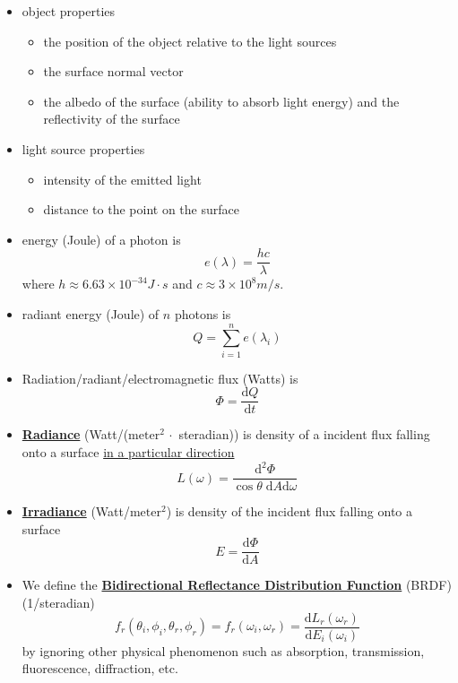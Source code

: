 \documentclass[twocolumn,landscape,10pt]{article}
\theoremstyle{definition}
\begin{document}
\begin{itemize}
    \item object properties
        \begin{itemize}
            \item the position of the object relative to the light sources
            \item the surface normal vector
            \item the albedo of the surface (ability to absorb light energy) and
                the reflectivity of the surface
        \end{itemize} 
    \item light source properties
        \begin{itemize}
            \item intensity of the emitted light
            \item distance to the point on the surface
        \end{itemize} 
    \item energy (Joule) of a photon is
        \[
            e(\lambda) = \frac{hc}{\lambda}
        \]
        where $h\approx 6.63\times 10^{-34}J\cdot s$ and $c\approx 3\times
        10^{8}m/s$.
    \item radiant energy (Joule) of $n$ photons is
        \[
            Q = \sum_{i=1}^{n} e(\lambda_i)
        \]
    \item Radiation/radiant/electromagnetic flux (Watts) is
        \[
            \Phi=\frac{\mathrm{d} Q}{\mathrm{d}t}
        \]
    \item \underline{\textbf{Radiance}} (Watt/($\text{meter}^{2}\,\cdot$ steradian)) 
        is density of a incident flux falling onto a surface 
        \underline{in a particular direction}
        \[
            L(\omega)=\frac{\mathrm{d}^2\Phi}{\cos{\theta}\;\mathrm{d}A\mathrm{d}\omega}
        \]
    \item \underline{\textbf{Irradiance}} (Watt/$\text{meter}^{2}$) 
        is density of the incident flux falling onto a surface
        \[
            E=\frac{\mathrm{d}\Phi}{\mathrm{d}A}
        \]
    \item  We define the
        \underline{\textbf{Bidirectional Reflectance Distribution Function}}
        (BRDF) (1/steradian)
        \[
            f_r(\theta_i,\phi_i,\theta_r,\phi_r)=
            f_r(\omega_i,\omega_r)=\frac{\mathrm{d}L_r(\omega_r)}{\mathrm{d}E_i(\omega_i)}
        \]
        by ignoring other physical phenomenon such as absorption,
        transmission, fluorescence, diffraction, etc.

\end{itemize}
\end{document}
